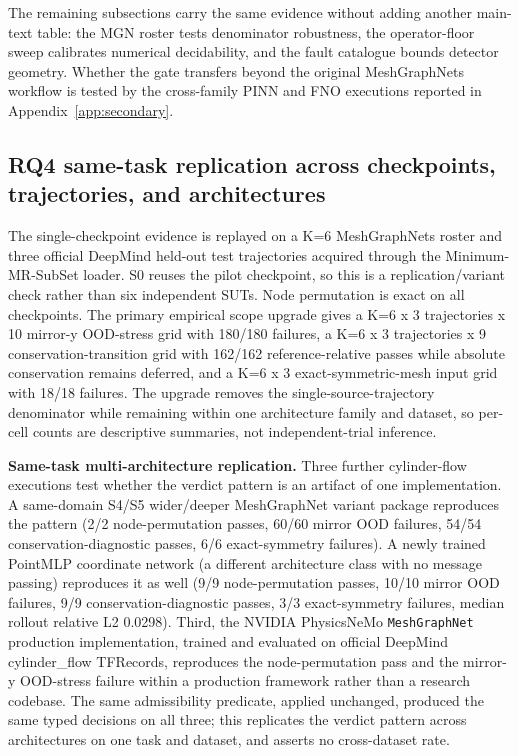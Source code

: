 \documentclass[preprint,12pt]{elsarticle}
\begin{document}
The remaining subsections carry the same evidence without adding another main-text table: the MGN roster tests denominator robustness, the operator-floor sweep calibrates numerical decidability, and the fault catalogue bounds detector geometry. Whether the gate transfers beyond the original MeshGraphNets workflow is tested by the cross-family PINN and FNO executions reported in Appendix~\ref{app:secondary}.

\subsection{RQ4 same-task replication across checkpoints, trajectories, and architectures}
\label{subsec:multicheckpoint-replication}

The single-checkpoint evidence is replayed on a K=6 MeshGraphNets roster and three official DeepMind held-out test trajectories acquired through the Minimum-MR-SubSet loader. S0 reuses the pilot checkpoint, so this is a replication/variant check rather than six independent SUTs. Node permutation is exact on all checkpoints. The primary empirical scope upgrade gives a K=6 x 3 trajectories x 10 mirror-y OOD-stress grid with 180/180 failures, a K=6 x 3 trajectories x 9 conservation-transition grid with 162/162 reference-relative passes while absolute conservation remains deferred, and a K=6 x 3 exact-symmetric-mesh input grid with 18/18 failures. The upgrade removes the single-source-trajectory denominator while remaining within one architecture family and dataset, so per-cell counts are descriptive summaries, not independent-trial inference.

\textbf{Same-task multi-architecture replication.} Three further cylinder-flow executions test whether the verdict pattern is an artifact of one implementation. A same-domain S4/S5 wider/deeper MeshGraphNet variant package reproduces the pattern (2/2 node-permutation passes, 60/60 mirror OOD failures, 54/54 conservation-diagnostic passes, 6/6 exact-symmetry failures). A newly trained PointMLP coordinate network (a different architecture class with no message passing) reproduces it as well (9/9 node-permutation passes, 10/10 mirror OOD failures, 9/9 conservation-diagnostic passes, 3/3 exact-symmetry failures, median rollout relative L2 0.0298). Third, the NVIDIA PhysicsNeMo \texttt{MeshGraphNet} production implementation, trained and evaluated on official DeepMind cylinder\_flow TFRecords, reproduces the node-permutation pass and the mirror-y OOD-stress failure within a production framework rather than a research codebase. The same admissibility predicate, applied unchanged, produced the same typed decisions on all three; this replicates the verdict pattern across architectures on one task and dataset, and asserts no cross-dataset rate.
\end{document}
